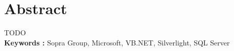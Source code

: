 \cleardoublepage

\chapter*{Abstract}

\thispagestyle{empty}



TODO
\\

\textbf{Keywords : } Sopra Group, Microsoft, VB.NET, Silverlight, SQL Server